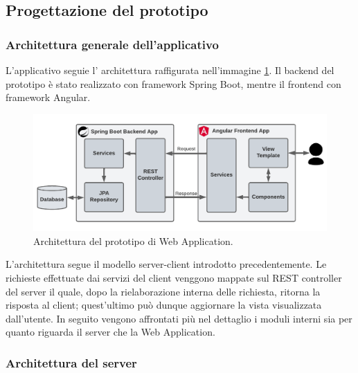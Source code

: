 \subsection{Progettazione del prototipo}
\subsubsection*{Architettura generale dell'applicativo}
L'applicativo seguie l' architettura raffigurata nell'immagine \ref{prototype-architecture}. Il backend del prototipo è stato realizzato con framework Spring Boot, mentre il frontend con framework Angular.
\FloatBarrier
\begin{figure}[!h]
\centering
\includegraphics[width=1\linewidth]{immagini/prototypeArchitecture.pdf}
\caption{Architettura del prototipo di Web Application.}
\label{prototype-architecture}
\end{figure}
\FloatBarrier
L'architettura segue il modello server-client introdotto precedentemente. Le richieste effettuate dai servizi del client venggono mappate sul REST controller del server il quale, dopo la rielaborazione interna delle richiesta, ritorna la risposta al client; quest'ultimo può dunque aggiornare la vista visualizzata dall'utente. In seguito vengono affrontati più nel dettaglio i moduli interni sia per quanto riguarda il server che la Web Application.
\subsubsection*{Architettura del server}
